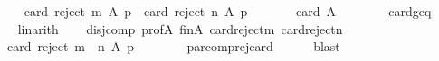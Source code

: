 \begin{isabellebody}
\ \ \isamarkupfalse%
\isanewline
\ \ \ \ {\isachardoublequoteopen}card\ {\isacharparenleft}{\kern0pt}reject\ m\ A\ p{\isacharparenright}{\kern0pt}\ {\isacharplus}{\kern0pt}\ card\ {\isacharparenleft}{\kern0pt}reject\ n\ A\ p{\isacharparenright}{\kern0pt}\ {\isacharequal}{\kern0pt}\isanewline
\ \ \ \ \ \ card\ A\ {\isacharplus}{\kern0pt}\ {}{\isachardoublequoteclose}\isanewline
\ \ \ \ \isamarkupfalse%
\ card{\isacharunderscore}{\kern0pt}geq{\isacharunderscore}{\kern0pt}{}\isanewline
\ \ \ \ \isamarkupfalse%
\ linarith\isanewline
\ \ \isamarkupfalse%
\ disj{\isacharunderscore}{\kern0pt}comp\ prof{\isacharunderscore}{\kern0pt}A\ fin{\isacharunderscore}{\kern0pt}A\ card{\isacharunderscore}{\kern0pt}reject{\isacharunderscore}{\kern0pt}m\ card{\isacharunderscore}{\kern0pt}reject{\isacharunderscore}{\kern0pt}n\isanewline
\ \ \isamarkupfalse%
\isanewline
\ \ \ \ {\isachardoublequoteopen}card\ {\isacharparenleft}{\kern0pt}reject\ {\isacharparenleft}{\kern0pt}m\ {\isasymparallel}\isactrlsub {\isasymup}\ n{\isacharparenright}{\kern0pt}\ A\ p{\isacharparenright}{\kern0pt}\ {\isacharequal}{\kern0pt}\ {}{\isachardoublequoteclose}\isanewline
\ \ \ \ \isamarkupfalse%
\ par{\isacharunderscore}{\kern0pt}comp{\isacharunderscore}{\kern0pt}rej{\isacharunderscore}{\kern0pt}card\isanewline
\ \ \ \ \isamarkupfalse%
\ blast\isanewline
{}\isamarkupfalse%
%
\endisatagproof
{\isafoldproof}%
%
\isadelimproof
\isanewline
%
\endisadelimproof
%
\isadelimtheory
\isanewline
%
\endisadelimtheory
%
\isatagtheory
{}\isamarkupfalse%
%
\endisatagtheory
{\isafoldtheory}%
%
\isadelimtheory
%
\endisadelimtheory
%
\end{isabellebody}%
\endinput
